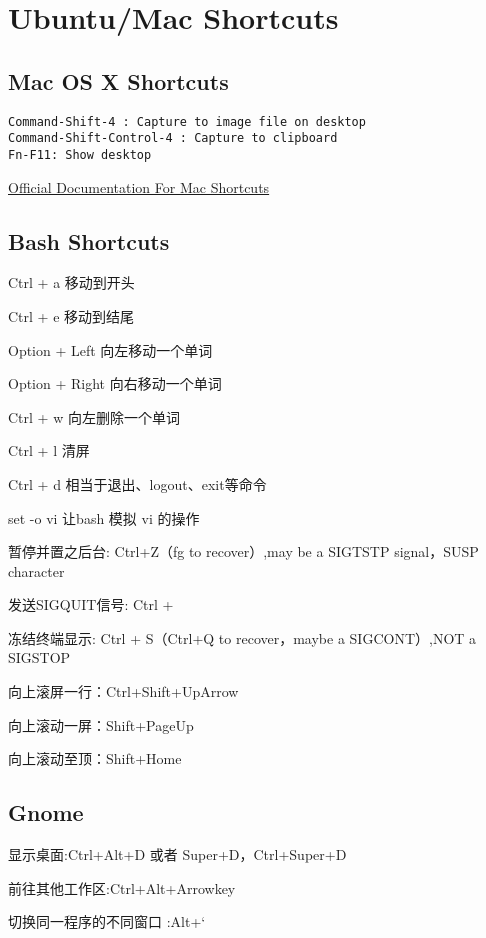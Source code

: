 \section{Ubuntu/Mac Shortcuts}

\subsection{Mac OS X Shortcuts}

\begin{verbatim}
Command-Shift-4 : Capture to image file on desktop
Command-Shift-Control-4 : Capture to clipboard
Fn-F11: Show desktop
\end{verbatim}

\href{https://support.apple.com/zh-cn/HT201236}{Official Documentation For Mac Shortcuts}

\subsection{Bash Shortcuts}

Ctrl + a	移动到开头

Ctrl + e	移动到结尾

Option + Left	向左移动一个单词

Option + Right	向右移动一个单词

Ctrl + w	向左删除一个单词

Ctrl + l	清屏

Ctrl + d	相当于退出、logout、exit等命令

set -o vi  让bash 模拟 vi 的操作

暂停并置之后台: Ctrl+Z（fg to recover）,may be a SIGTSTP signal，SUSP character

发送SIGQUIT信号: Ctrl + \

冻结终端显示: Ctrl + S（Ctrl+Q to recover，maybe a SIGCONT）,NOT a SIGSTOP

向上滚屏一行：Ctrl+Shift+UpArrow

向上滚动一屏：Shift+PageUp

向上滚动至顶：Shift+Home


\subsection{Gnome}

显示桌面:Ctrl+Alt+D 或者 Super+D，Ctrl+Super+D

前往其他工作区:Ctrl+Alt+Arrowkey

切换同一程序的不同窗口 :Alt+`

